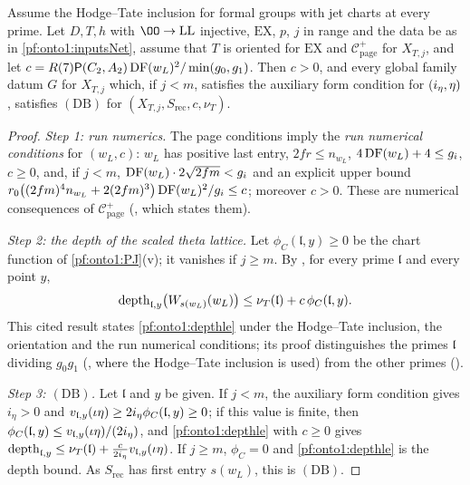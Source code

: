 \begin{theorem}\label{pf:onto1:combBound}
Assume the Hodge--Tate inclusion for formal groups with jet charts at every prime. Let $D,T,h$ with $\OO\to\mathrm{LL}$ injective,
$\mathrm{EX}$, $p$, $j$ in range and the data be as in \cref{pf:onto1:inputsNet}, assume that $T$ is oriented for $\mathrm{EX}$ and
$\mathcal C^+_{\mathrm{page}}$ for $X_{T,j}$, and let $c=R(7)\mathsf{P}(C_2,A_2)\operatorname{DF}(w_L)^2/\min(g_0,g_1)$. Then $c>0$, and every global
family datum $G$ for $X_{T,j}$ which, if $j<m$, satisfies the auxiliary form condition for $(i_\eta,\eta)$, satisfies
$(\mathrm{DB})$ for $(X_{T,j},S_{\mathrm{rec}},c,\nu_T)$.
\end{theorem}

\begin{proof}
\emph{Step 1: run numerics.} The page conditions imply the \emph{run numerical conditions} for $(w_L,c)$: $w_L$ has positive
last entry, $2fr\le n_{w_L}$, $4\operatorname{DF}(w_L)+4\le g_i$, $c\ge0$, and, if $j<m$, $\operatorname{DF}(w_L)\cdot2\sqrt{2fm}<g_i$ and an explicit
upper bound $r_0\bigl((2fm)^4n_{w_L}+2(2fm)^3\bigr)\operatorname{DF}(w_L)^2/g_i\le c$; moreover $c>0$. These are numerical consequences of
$\mathcal C^+_{\mathrm{page}}$ (, which states them).

\emph{Step 2: the depth of the scaled theta lattice.} Let $\phi_C(\mathfrak l,y)\ge0$ be the chart function of
\cref{pf:onto1:PJ}(v); it vanishes if $j\ge m$. By , for every
prime $\mathfrak l$ and every point $y$,
\begin{equation}\label{pf:onto1:depthle}
\operatorname{depth}_{\mathfrak l,y}\bigl(W_{s(w_L)}(w_L)\bigr)\le\nu_T(\mathfrak l)+c\,\phi_C(\mathfrak l,y).
\end{equation}
This cited result states \eqref{pf:onto1:depthle} under the Hodge--Tate inclusion, the orientation and the run numerical
conditions; its proof distinguishes the primes $\mathfrak l$ dividing $g_0g_1$
(, where the Hodge--Tate inclusion is used) from the other
primes ().

\emph{Step 3: $(\mathrm{DB})$.} Let $\mathfrak l$ and $y$ be given. If $j<m$, the auxiliary form condition gives $i_\eta>0$ and
$v_{\mathfrak l,y}(\iota\eta)\ge2i_\eta\phi_C(\mathfrak l,y)\ge0$; if this value is finite, then $\phi_C(\mathfrak l,y)\le
v_{\mathfrak l,y}(\iota\eta)/(2i_\eta)$, and \eqref{pf:onto1:depthle} with $c\ge0$ gives $\operatorname{depth}_{\mathfrak l,y}\le\nu_T(\mathfrak
l)+\frac c{2i_\eta}v_{\mathfrak l,y}(\iota\eta)$. If $j\ge m$, $\phi_C=0$ and \eqref{pf:onto1:depthle} is the depth bound. As
$S_{\mathrm{rec}}$ has first entry $s(w_L)$, this is $(\mathrm{DB})$.
\end{proof}


